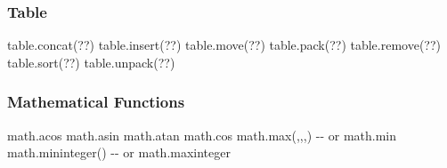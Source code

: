 \documentclass{refcard}
\newcommand{\X}{\I{x}}
\newcommand{\Y}{\I{y}}
\newcommand{\Z}{\I{z}}
\newcommand{\W}{\I{w}}
\begin{document}
\subsubsection{Table}

\begin{ldesc}
	\li[??] table.concat(??)
	\li[??] table.insert(??)
	\li[??] table.move(??)
	\li[??] table.pack(??)
	\li[??] table.remove(??)
	\li[??] table.sort(??)
	\li[??] table.unpack(??)
\end{ldesc}


\subsubsection{Mathematical Functions}

\begin{ldesc}
	\li[Trigonometry] math.acos math.asin math.atan math.cos
	   math.max(\X,\Y,\Z,\W) -{-} or math.min
	    math.mininteger()     -{-} or math.maxinteger
\end{ldesc}
\end{document}
